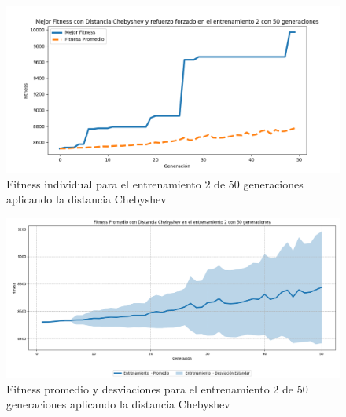 \documentclass[conference]{IEEEtran}
\begin{document}
\begin{figure}[H]
    \centering
    \includegraphics[width=0.9 \linewidth]{Chebyshev/Fitness_individual_50Gen/Fitness_2_Cheby_50Gen.png}
    \caption{Fitness individual para el entrenamiento 2 de 50 generaciones aplicando la distancia Chebyshev}
    \label{fig:cheb_2_50}
\end{figure}
\begin{figure}[H]
    \centering
    \includegraphics[width=0.9 \linewidth]{Chebyshev/Fitness_individual_50Gen/Fitness_2_Cheby_50Gen_Sombra.png}
    \caption{Fitness promedio y desviaciones para el entrenamiento 2 de 50 generaciones aplicando la distancia Chebyshev}
    \label{fig:cheb_2_50_sombra}
\end{figure}
\end{document}
